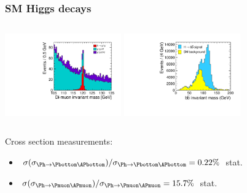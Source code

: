 \documentclass{beamer}
\begin{document}
\begin{frame}
\frametitle{SM Higgs decays}
\begin{columns}[c]
\column{6cm}
\centering
\includegraphics[width=5cm]{ee_h_mumu_mass_mh120GeV.pdf}
\column{6cm}
\centering
\includegraphics[width=5cm]{../SIDWorkshop/ee_h_bb_mass_mh120GeV}
\end{columns}
Cross section measurements:
\begin{itemize}
  \item
  $\sigma(\sigma_{\Ph\to\Pbottom\APbottom})/\sigma_{\Ph\to\Pbottom\APbottom} =
  0.22\%$ stat.
  \item $\sigma(\sigma_{\Ph\to\Pmuon\APmuon})/\sigma_{\Ph\to\Pmuon\APmuon}
  = 15.7\%$ stat.
\end{itemize}
\end{frame}
\end{document}
